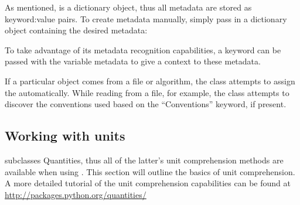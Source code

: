 \documentclass[a4paper,10pt,openany,english]{sphinxmanual}
\begin{document}
As mentioned, {\hyperref[egadsapi:egads.core.metadata.VariableMetadata]{}} is a dictionary object, thus all metadata are stored as keyword:value pairs. To create metadata manually, simply pass in a dictionary object containing the desired metadata:

\begin{sphinxVerbatim}[commandchars=\\\{\}]
  
  
\end{sphinxVerbatim}

To take advantage of its metadata recognition capabilities, a  keyword can be passed with the variable metadata to give a context to these metadata.

\begin{sphinxVerbatim}[commandchars=\\\{\}]
   
\end{sphinxVerbatim}

If a particular {\hyperref[egadsapi:egads.core.metadata.VariableMetadata]{}} object comes from a file or algorithm, the class attempts to assign the  automatically. While reading from a file, for example, the class attempts to discover the conventions used based on the ``Conventions'' keyword, if present.


\subsection{Working with units}
\label{tutorial:working-with-units}
{\hyperref[egadsapi:egads.core.egads_core.EgadsData]{}} subclasses Quantities, thus all of the latter's unit comprehension methods are available when using {\hyperref[egadsapi:egads.core.egads_core.EgadsData]{}}. This section will outline the basics of unit comprehension. A more detailed tutorial of the unit comprehension capabilities can be found at \url{http://packages.python.org/quantities/}
\end{document}
